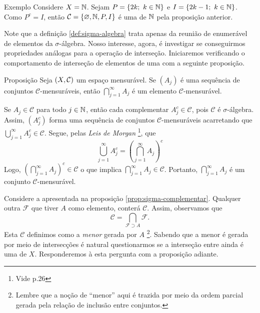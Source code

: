 \begin{env}{Exemplo}
    Considere $X = \operatorname{\mathbb{N}}$. 
    Sejam $P =\{2k; \ k \in \operatorname{\mathbb{N}}\}$ e $I = \{2k - 1;\ k \in \operatorname{\mathbb{N}}\}$. 
    Como $P^c = I$, então $\mathcal{C} = \{\varnothing, \operatorname{\mathbb{N}}, P, I\}$ é uma \sigal de $\operatorname{\mathbb{N}}$ pela proposição anterior.
    \vspace{-0.2cm}
\end{env}
 
Note que a definição \ref{def:sigma-algebra} trata apenas da reunião de enumerável de elementos da $\sigma$-álgebra. 
Nosso interesse, agora, é investigar se conseguirmos propriedades análogas para a operação de interseção. 
Iniciaremos verificando o comportamento de interseção de elementos de uma \sigal com a seguinte proposição.

\begin{env}{Proposição}
\label{prop:interseção-elementos-sigmas}
    Seja $(X, \operatorname{\mathcal{C}})$ um espaço mensurável.
    Se $(A_j)$ é uma sequência  de conjuntos $\mathcal{C} $-mensuráveis, então $\displaystyle \bigcap_{j = 1}^\infty A_j$ é um elemento $\mathcal{C}$-mensurável.
    \vspace{-0.2cm}
\end{env}
\begin{prova}
    Se $A_j \in \mathcal{C}$ para todo $j \in \operatorname{\mathbb{N}}$, então cada complementar $A_j^c \in \mathcal{C}$, pois $\mathcal{C}$ é $\sigma$-álgebra. 
    Assim, $(A_j^c)$ forma uma sequência de conjuntos $\mathcal{C}$-mensuráveis acarretando que 
    $\displaystyle \bigcup_{j = 1}^\infty A_j^c \in \mathcal{C}$. 
    Segue, pelas \textit{Leis de Morgan}
    \footnote{Vide \supercite{elon}{p.26}}, que 
    $$
    \displaystyle \bigcup_{j = 1}^\infty A_j^c 
    = \left(\displaystyle \bigcap_{j = 1}^\infty A_j\right)^c
  	$$
	Logo, $\left(\displaystyle \bigcap_{j = 1}^\infty A_j\right)^c \in \mathcal{C}$ o que implica $\displaystyle \bigcap_{j = 1}^\infty A_j \in \mathcal{C}$. 
	Portanto, $\displaystyle \bigcap_{j = 1}^\infty A_j$ é um conjunto $\mathcal{C}$-mensurável.
\end{prova}

Considere a \sigal apresentada na proposição \ref{prop:sigma-complementar}. 
Qualquer outra \sigal $\mathcal{F}$ que tiver $A$ como elemento, conterá $\mathcal{C}$.
Assim, observamos que 
$$
\mathcal{C} = \displaystyle \bigcap_{\mathcal{F} \supset A} \mathcal{F}.
$$
Esta \sigal $\mathcal{C}$   definimos como a \textit{menor} \sigal gerada por $A$ 
%
\footnote{Lembre que a noção de \enquote{menor} aqui é trazida por meio da ordem parcial gerada pela relação de inclusão entre conjuntos.}.
%
Sabendo que a menor \sigal é gerada por meio de intersecções é natural questionarmos se a interseção entre \sigals ainda é uma \sigal de $X$.
Responderemos à esta pergunta com a proposição adiante.

